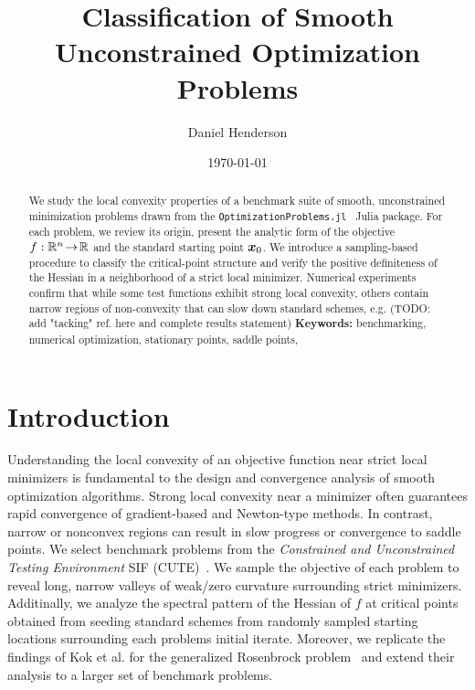 \documentclass[10pt]{article}
\title{Classification of Smooth Unconstrained Optimization Problems}
\author{Daniel Henderson}
\date{\today}
\begin{document}
\maketitle


\begin{abstract}
    \noindent
    We study the local convexity properties of a benchmark suite of smooth, 
    unconstrained minimization problems drawn from the 
    \texttt{OptimizationProblems.jl}~\cite{OptimizationProblems} Julia package.
    For each problem, we review its origin, present the analytic form
    of the objective $f:\mathbb{R}^n\!\to\!\mathbb{R}$ and the standard starting point
    $\bm{x}_0$.  We introduce a sampling-based procedure to classify
    the critical-point structure and verify the positive definiteness of
    the Hessian in a neighborhood of a strict local minimizer.  Numerical
    experiments confirm that while some test functions exhibit strong
    local convexity, others contain narrow regions of non-convexity that
    can slow down standard schemes, e.g. (TODO: add "tacking" ref. here and complete
    results statement)
    \noindent\textbf{Keywords:} benchmarking, numerical optimization, stationary points, saddle points,
\end{abstract}



\tableofcontents
\newpage


\section{Introduction}
    \label{sec:intro}
    \medskip

    Understanding the local convexity of an objective function
    near strict local minimizers is fundamental to the design 
    and convergence analysis of smooth optimization algorithms. 
    Strong local convexity near a minimizer often guarantees rapid 
    convergence of gradient-based and Newton-type methods. In 
    contrast, narrow or nonconvex regions can result in slow progress 
    or convergence to saddle points. We select benchmark problems from the
    \emph{Constrained and Unconstrained Testing Environment} SIF (CUTE)~\cite{CUTE}.
    We sample the objective of each problem to reveal long, 
    narrow valleys of weak/zero curvature surrounding strict minimizers.
    Additinally, we analyze the spectral pattern of the Hessian of $f$ at
    critical points obtained from seeding standard schemes from randomly
    sampled starting locations surrounding each problems initial iterate.
    Moreover, we replicate the findings of Kok et al. for the generalized
    Rosenbrock problem~\cite{Kok2009} and extend their analysis to 
    a larger set of benchmark problems.
  
\end{document}
